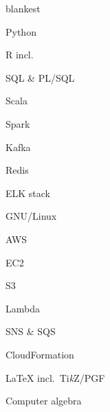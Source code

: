 \documentclass[%
version=last,%
fontsize=11pt,%
paper=A4,%
headinclude=false,%
footinclude=false,%
headlines=0,%
footlines=0,%
areasetadvanced,%
toc=bibnumbered,%
]{scrartcl}%
\begin{document}
\begin{minipage}[t]{.4\textwidth}
  \begin{UniformTCBRaster}{2}
    \begin{tcboxedraster}[raster columns=1]{blankest}
      \begin{TCBItems}
      \item Python
      \item R incl.\ 
      \item SQL \& PL/SQL
      \item Scala
      \end{TCBItems}
      \begin{tcolorbox}
        \begin{minipage}[t]{0.4\linewidth}
          \begin{citemize}
          \item Spark
          \item Kafka
          \end{citemize}
        \end{minipage}%
        \hfill%
        \begin{minipage}[t]{0.6\linewidth}
          \begin{citemize}
          \item Redis
          \item ELK stack
          \end{citemize}          
        \end{minipage}
      \end{tcolorbox}
    \end{tcboxedraster}
    \begin{TCBItems}
    \item GNU/Linux
    \item AWS
      \begin{citemize}
      \item EC2
      \item S3
      \item Lambda
      \item SNS \& SQS
      \item CloudFormation
      \end{citemize}
    \end{TCBItems}
    \begin{tcolorbox}
      \LaTeX{} incl.\ Ti\emph{k}Z/PGF
    \end{tcolorbox}
    \begin{tcolorbox}
      Computer algebra
    \end{tcolorbox}
  \end{UniformTCBRaster}


\end{minipage}
\end{document}
